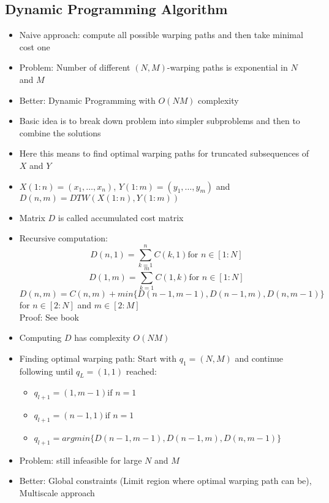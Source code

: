 \documentclass{scrartcl}
\begin{document}
\subsection*{Dynamic Programming Algorithm}
\begin{itemize}
    \item
        Naive approach: compute all possible warping paths and then take minimal cost one
    \item
        Problem: Number of different $(N,M)$-warping paths is exponential in $N$ and $M$
    \item
        Better: Dynamic Programming with $O(NM)$ complexity
    \item
        Basic idea is to break down problem into simpler subproblems and then to combine the solutions
    \item
        Here this means to find optimal warping paths for truncated subsequences of $X$ and $Y$ \\
    \item
        $X(1:n) = (x_1, \dots, x_n)$, $Y(1:m) = (y_1, \dots, y_m)$ and $D(n,m) = DTW(X(1:n), Y(1:m))$
    \item
        Matrix $D$ is called accumulated cost matrix
    \item
        Recursive computation:
        $$D(n,1) = \sum_{k=1}^n C(k,1) \text{for } n \in [1:N]$$
        $$D(1,m) = \sum_{k=1}^m C(1,k) \text{for } n \in [1:N]$$
        $$D(n,m) = C(n,m) + min \{D(n-1, m-1), D(n-1,m), D(n, m-1)\}$$
        for $n\in[2:N]$ and $m\in[2:M]$\\
        Proof: See book
    \item
        Computing $D$ has complexity $O(NM)$
    \item
        Finding optimal warping path: Start with $q_1=(N,M)$ and continue following until $q_L = (1,1)$ reached:
        \begin{itemize}
            \item
                $q_{l+1} = (1, m-1) \text{if } n=1$
            \item
                $q_{l+1} = (n-1, 1) \text{if } n=1$
            \item
                $q_{l+1} = argmin\{D(n-1,m-1), D(n-1, m), D(n,m-1)\}$
        \end{itemize}
    \item
        Problem: still infeasible for large $N$ and $M$
    \item
        Better: Global constraints (Limit region where optimal warping path can be), Multiscale approach
\end{itemize}
\end{document}
